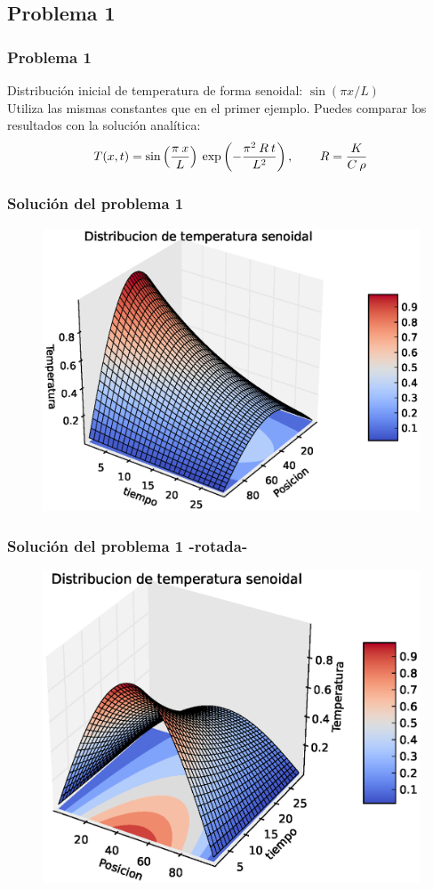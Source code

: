 \subsection{Problema 1}
\begin{frame}
\frametitle{Problema 1}
Distribución inicial de temperatura de forma senoidal: $\sin( \pi x / L)$
\\
\bigskip
Utiliza las mismas constantes que en el primer ejemplo. Puedes comparar los resultados con la solución analítica:
\[ T(x,t) = \sin \left( \dfrac{\pi \: x}{L} \right) \: \exp \left(-\dfrac{\pi^{2} \: R \: t}{L^{2}} \right), \hspace{0.75cm} R=\dfrac{K}{C \: \rho} \]
\end{frame}
\begin{frame}
\frametitle{Solución del problema 1}
\begin{figure}
	\centering
	\includegraphics[scale=0.5]{Imagenes/EqCalor04.eps}  
\end{figure}
\end{frame}
\begin{frame}
\frametitle{Solución del problema 1 -rotada-}
\begin{figure}
	\centering
	\includegraphics[scale=0.5]{Imagenes/EqCalor05.eps}  
\end{figure}
\end{frame}
